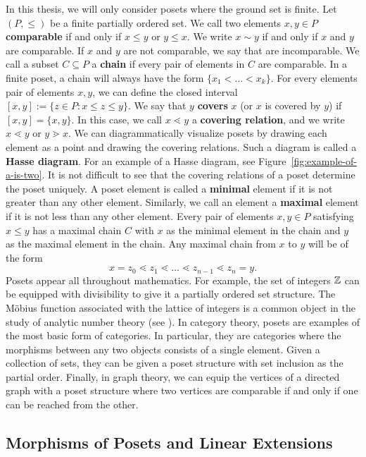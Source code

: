 \documentclass{puthesis-UG}
\begin{document}
In this thesis, we will only consider posets where the ground set is finite. Let $(P, \leq)$ be a finite partially ordered set. We call two elements $x, y \in P$ \textbf{comparable} if and only if $x \leq y$ or $y \leq x$. We write $x \sim y$ if and only if $x$ and $y$ are comparable. If $x$ and $y$ are not comparable, we say that are incomparable. We call a subset $C \subseteq P$ a \textbf{chain} if every pair of elements in $C$ are comparable. In a finite poset, a chain will always have the form $\{x_1 < \ldots < x_k\}$. For every elements pair of elements $x, y$, we can define the closed interval $[x, y] := \{z \in P : x \leq z \leq y\}$. We say that $y$ \textbf{covers} $x$ (or $x$ is covered by $y$) if $[x, y] = \{x, y\}$. In this case, we call $x \lessdot y$ a \textbf{covering relation}, and we write $x \lessdot y$ or $y \gtrdot x$. We can diagrammatically visualize posets by drawing each element as a point and drawing the covering relations. Such a diagram is called a \textbf{Hasse diagram}. For an example of a Hasse diagram, see Figure~\ref{fig:example-of-a-is-two}. It is not difficult to see that the covering relations of a poset determine the poset uniquely. A poset element is called a \textbf{minimal} element if it is not greater than any other element. Similarly, we call an element a \textbf{maximal} element if it is not less than any other element. Every pair of elements $x, y \in P$ satisfying $x \leq y$ has a maximal chain $C$ with $x$ as the minimal element in the chain and $y$ as the maximal element in the chain. Any maximal chain from $x$ to $y$ will be of the form 
\[
	x = z_0 \lessdot z_1 \lessdot \ldots \lessdot z_{n-1} \lessdot z_n = y. 
\]
Posets appear all throughout mathematics. For example, the set of integers $\mathbb{Z}$ can be equipped with divisibility to give it a partially ordered set structure. The M\"obius function associated with the lattice of integers is a common object in the study of analytic number theory (see \cite{Apostol2013-an}). In category theory, posets are examples of the most basic form of categories. In particular, they are categories where the morphisms between any two objects consists of a single element. Given a collection of sets, they can be given a poset structure with set inclusion as the partial order. Finally, in graph theory, we can equip the vertices of a directed graph with a poset structure where two vertices are comparable if and only if one can be reached from the other. 

\subsection{Morphisms of Posets and Linear Extensions}
\end{document}
